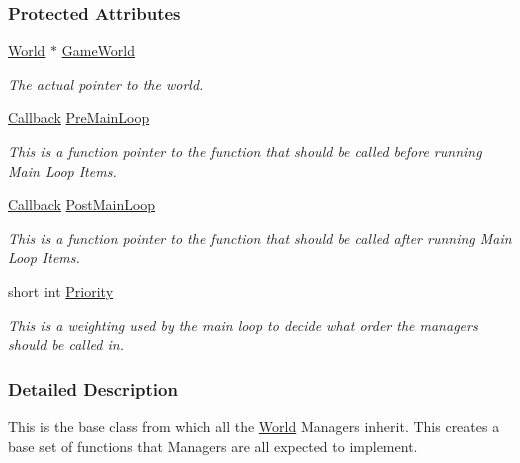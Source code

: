 \subsubsection*{Protected Attributes}
\begin{DoxyCompactItemize}
\item 
\hyperlink{classphys_1_1World}{World} $\ast$ \hyperlink{classphys_1_1ManagerBase_ae2f158b4b2fef1bf2bee2524e0236c7b}{GameWorld}
\begin{DoxyCompactList}\small\item\em The actual pointer to the world. \item\end{DoxyCompactList}\item 
\hyperlink{classphys_1_1ManagerBase_a753f5f0127131529767beab2502f480b}{Callback} \hyperlink{classphys_1_1ManagerBase_a93eb2f1a30d913a4e99180b0965eb5db}{PreMainLoop}
\begin{DoxyCompactList}\small\item\em This is a function pointer to the function that should be called before running Main Loop Items. \item\end{DoxyCompactList}\item 
\hyperlink{classphys_1_1ManagerBase_a753f5f0127131529767beab2502f480b}{Callback} \hyperlink{classphys_1_1ManagerBase_aa1e80a30f151c07e06d1f4650f315da5}{PostMainLoop}
\begin{DoxyCompactList}\small\item\em This is a function pointer to the function that should be called after running Main Loop Items. \item\end{DoxyCompactList}\item 
short int \hyperlink{classphys_1_1ManagerBase_a28e2690fbcf644a7780a53b81821d8ef}{Priority}
\begin{DoxyCompactList}\small\item\em This is a weighting used by the main loop to decide what order the managers should be called in. \item\end{DoxyCompactList}\end{DoxyCompactItemize}


\subsubsection{Detailed Description}
This is the base class from which all the \hyperlink{classphys_1_1World}{World} Managers inherit. This creates a base set of functions that Managers are all expected to implement. 

